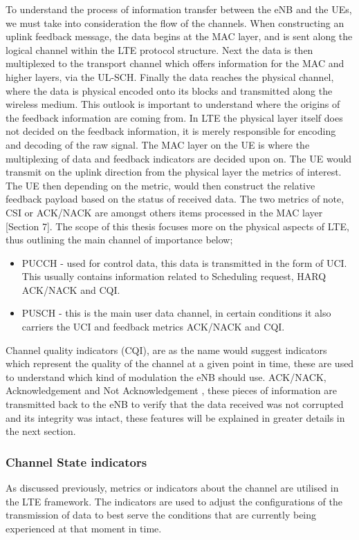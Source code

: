 \documentclass{article}
\begin{document}
To understand the process of information transfer between the eNB and the UEs, we must take into consideration the flow of the channels. When constructing an uplink feedback message, the data begins at the MAC layer, and is sent along the logical channel within the LTE protocol structure. Next the data is then multiplexed to the transport channel which offers information for the MAC and higher layers, via the UL-SCH. Finally the data reaches the physical channel, where the data is physical encoded onto its blocks and transmitted along the wireless medium. This outlook is important to understand where the origins of the feedback information are coming from. In LTE the physical layer itself does not decided on the feedback information, it is merely responsible for encoding and decoding of the raw signal. The MAC layer on the UE is where the multiplexing of data and feedback indicators are decided upon on. The UE would transmit on the uplink direction from the physical layer the metrics of interest. The UE then depending on the metric, would then construct the relative feedback payload based on the status of received data. The two metrics of note, \ac{CSI} or ACK/NACK are amongst others items processed in the MAC layer \cite{3gpp25319}[Section 7]. The scope of this thesis focuses more on the physical aspects of LTE, thus outlining the main channel of importance below;
\begin{itemize}
    \item PUCCH - used for control data, this data is transmitted in the form of \ac{UCI}. This usually contains information related to Scheduling request, HARQ ACK/NACK and CQI. 
    \item PUSCH - this is the main user data channel, in certain conditions it also carriers the UCI and feedback metrics ACK/NACK and CQI.
\end{itemize}
Channel quality indicators (CQI), are as the name would suggest indicators which represent the quality of the channel at a given point in time, these are used to understand which kind of modulation the eNB should use. ACK/NACK, Acknowledgement and Not Acknowledgement , these pieces of information are transmitted back to the eNB to verify that the data received was not corrupted and its integrity was intact, these features will be explained in greater details in the next section.

\subsubsection{Channel State indicators}
As discussed previously, metrics or indicators about the channel are utilised in the LTE framework. The indicators are used to adjust the configurations of the transmission of data to best serve the conditions that are currently being experienced at that moment in time. 
\end{document}
